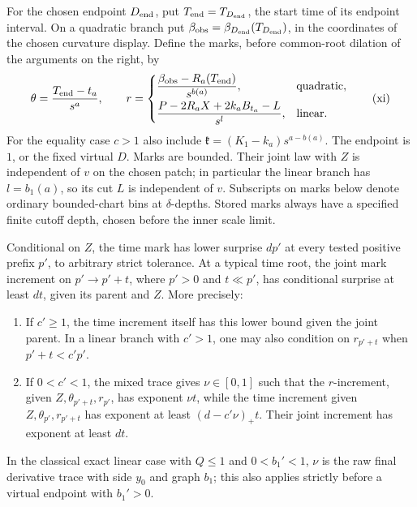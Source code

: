 For the chosen endpoint \(D_{\rm end}\), put
\(T_{\rm end}=T_{D_{\rm end}}\), the start time of its endpoint
interval. On a quadratic branch put
\(\beta_{\rm obs}=\beta_{D_{\rm end}}(T_{D_{\rm end}})\), in
the coordinates of the chosen curvature display. Define the marks,
before common-root dilation of the arguments on the right, by
\begin{equation}
 \theta=\frac{T_{\rm end}-t_a}{s^a},\qquad
 r=\begin{cases}
 \displaystyle\frac{\beta_{\rm obs}-R_a(T_{\rm end})}{s^{b(a)}},
       &\text{quadratic},\\[6pt]
 \displaystyle\frac{P-2R_aX+2k_aB_{t_a}-L}{s^l},
       &\text{linear}.
 \end{cases}
 \tag{xi}\label{eq:xi}
\end{equation}
For the equality case \(c>1\) also include
\(\mathfrak k=(K_1-k_a)s^{a-b(a)}\).
The endpoint is \(1\), or the fixed virtual \(D\). Marks are
bounded. Their joint law with \(Z\) is independent of \(v\) on
the chosen patch; in particular the linear branch has
\(l=b_1(a)\), so its cut \(L\) is independent of \(v\).
Subscripts on marks below denote ordinary bounded-chart bins at
\(\delta\)-depths. Stored marks always have a specified finite
cutoff depth, chosen before the inner scale limit.

\begin{proposition}
\label{names:mark-dimension}
Conditional on \(Z\), the time mark has lower surprise
\(dp'\) at every tested positive prefix \(p'\), to arbitrary
strict tolerance. At a typical time root, the joint mark increment
on \(p'\to p'+t\), where \(p'>0\) and \(t\ll p'\), has
conditional surprise at least \(dt\), given its parent and \(Z\).
More precisely:
\begin{enumerate}[label=(\roman*)]
\item If \(c'\geq1\), the time increment itself has this lower
bound given the joint parent. In a linear branch with \(c'>1\),
one may also condition on \(r_{p'+t}\) when
\(p'+t<c'p'\).
\item If \(0<c'<1\), the mixed trace gives \(\nu\in[0,1]\)
such that the \(r\)-increment, given
\(Z,\theta_{p'+t},r_{p'}\), has exponent \(\nu t\), while
the time increment given \(Z,\theta_{p'},r_{p'+t}\) has exponent
at least \((d-c'\nu)_+t\). Their joint increment has exponent
at least \(dt\).
\end{enumerate}
In the classical exact linear case with \(Q\leq1\) and
\(0<b_1'<1\), \(\nu\) is the raw final derivative trace with
side \(y_0\) and graph \(b_1\); this also applies strictly
before a virtual endpoint with \(b_1'>0\).
\end{proposition}

